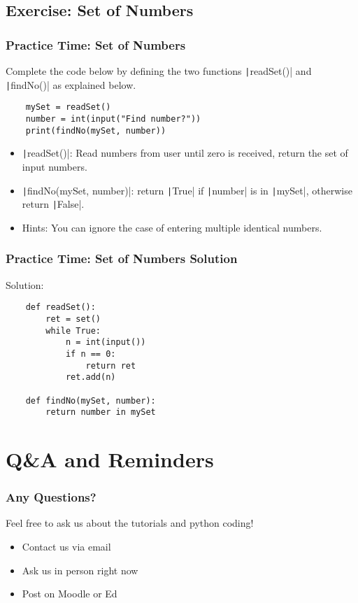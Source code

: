 \documentclass{beamer}
\newcommand{\python}[1]{\texttt|#1|}
\begin{document}
\subsection{Exercise: Set of Numbers}
\begin{frame}[fragile]
    \frametitle{Practice Time: Set of Numbers}

    Complete the code below by defining the two functions
    \python{readSet()} and \python{findNo()} as explained below.

    \begin{verbatim}
    mySet = readSet()
    number = int(input("Find number?"))
    print(findNo(mySet, number))
    \end{verbatim}

    \begin{itemize}
        \item \python{readSet()}:
              Read numbers from user until zero is received,
              return the set of input numbers.
        \item \python{findNo(mySet, number)}:
              return \python{True} if \python{number} is in \python{mySet},
              otherwise return \python{False}.
        \item Hints: You can ignore the case of entering multiple identical numbers.
    \end{itemize}
\end{frame}
\begin{frame}[fragile]
    \frametitle{Practice Time: Set of Numbers Solution}

    Solution:
    \begin{verbatim}
    def readSet():
        ret = set()
        while True:
            n = int(input())
            if n == 0:
                return ret
            ret.add(n)
    
    def findNo(mySet, number):
        return number in mySet
    \end{verbatim}
\end{frame}

\section{Q\&A and Reminders}
\begin{frame}
    \frametitle{Any Questions?}

    Feel free to ask us about the tutorials and python coding!

    \begin{itemize}
        \item Contact us via email
        \item Ask us in person right now
        \item Post on Moodle or Ed
    \end{itemize}
\end{frame}
\end{document}
